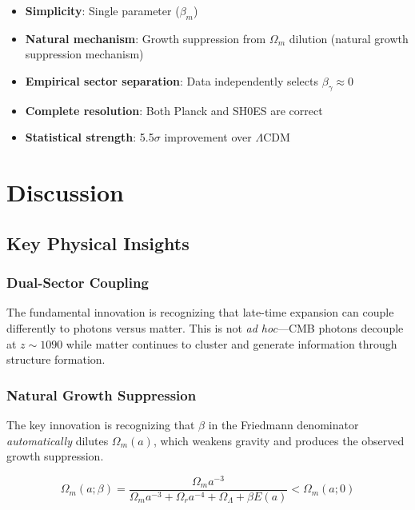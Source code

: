 \documentclass[11pt,letterpaper]{article}
\begin{document}
\begin{itemize}
\item \textbf{Simplicity}: Single parameter ($\beta_m$)
\item \textbf{Natural mechanism}: Growth suppression from $\Omega_m$ dilution (natural growth suppression mechanism)
\item \textbf{Empirical sector separation}: Data independently selects $\beta_\gamma \approx 0$
\item \textbf{Complete resolution}: Both Planck and SH0ES are correct
\item \textbf{Statistical strength}: 5.5$\sigma$ improvement over $\Lambda$CDM
\end{itemize}

\section{Discussion}

\subsection{Key Physical Insights}

\subsubsection{Dual-Sector Coupling}

The fundamental innovation is recognizing that late-time expansion can couple differently to photons versus matter. This is not \textit{ad hoc}---CMB photons decouple at $z \sim 1090$ while matter continues to cluster and generate information through structure formation.

\subsubsection{Natural Growth Suppression}

The key innovation is recognizing that $\beta$ in the Friedmann denominator \textit{automatically} dilutes $\Omega_m(a)$, which weakens gravity and produces the observed growth suppression.

\begin{equation}
\Omega_m(a; \beta) = \frac{\Omega_m a^{-3}}{\Omega_m a^{-3} + \Omega_r a^{-4} + \Omega_\Lambda + \beta E(a)} < \Omega_m(a; 0)
\end{equation}
\end{document}
